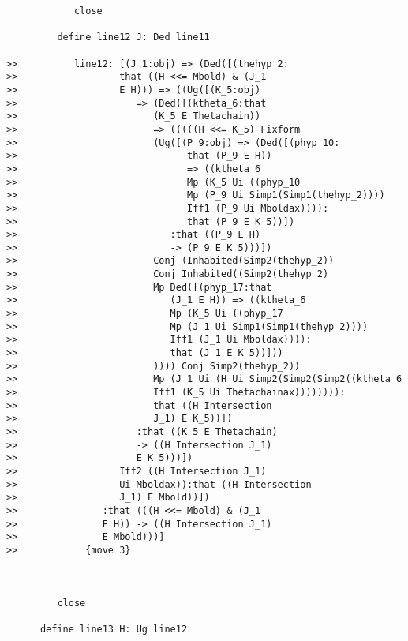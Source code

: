 \documentclass[12pt]{article}
\begin{document}
\begin{verbatim}
            close

         define line12 J: Ded line11

>>          line12: [(J_1:obj) => (Ded([(thehyp_2:
>>                  that ((H <<= Mbold) & (J_1
>>                  E H))) => ((Ug([(K_5:obj)
>>                     => (Ded([(ktheta_6:that
>>                        (K_5 E Thetachain))
>>                        => (((((H <<= K_5) Fixform
>>                        (Ug([(P_9:obj) => (Ded([(phyp_10:
>>                              that (P_9 E H))
>>                              => ((ktheta_6
>>                              Mp (K_5 Ui ((phyp_10
>>                              Mp (P_9 Ui Simp1(Simp1(thehyp_2))))
>>                              Iff1 (P_9 Ui Mboldax)))):
>>                              that (P_9 E K_5))])
>>                           :that ((P_9 E H)
>>                           -> (P_9 E K_5)))])
>>                        Conj (Inhabited(Simp2(thehyp_2))
>>                        Conj Inhabited((Simp2(thehyp_2)
>>                        Mp Ded([(phyp_17:that
>>                           (J_1 E H)) => ((ktheta_6
>>                           Mp (K_5 Ui ((phyp_17
>>                           Mp (J_1 Ui Simp1(Simp1(thehyp_2))))
>>                           Iff1 (J_1 Ui Mboldax)))):
>>                           that (J_1 E K_5))]))
>>                        )))) Conj Simp2(thehyp_2))
>>                        Mp (J_1 Ui (H Ui Simp2(Simp2(Simp2((ktheta_6
>>                        Iff1 (K_5 Ui Thetachainax)))))))):
>>                        that ((H Intersection
>>                        J_1) E K_5))])
>>                     :that ((K_5 E Thetachain)
>>                     -> ((H Intersection J_1)
>>                     E K_5)))])
>>                  Iff2 ((H Intersection J_1)
>>                  Ui Mboldax)):that ((H Intersection
>>                  J_1) E Mbold))])
>>               :that (((H <<= Mbold) & (J_1
>>               E H)) -> ((H Intersection J_1)
>>               E Mbold)))]
>>            {move 3}



         close

      define line13 H: Ug line12


\end{verbatim}
\end{document}
